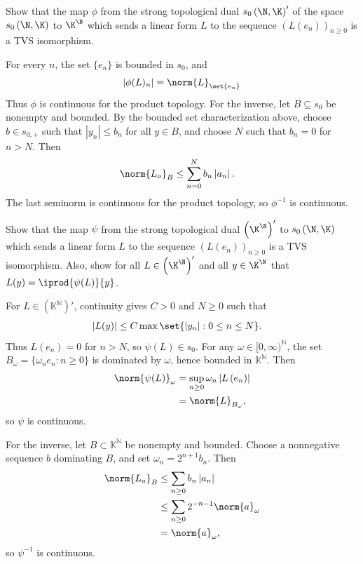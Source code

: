 \documentclass[10pt]{mypackage}
\begin{document}
\begin{problem}[Problem IV.1]
  Show that the map $\phi$ from the strong topological dual $s_0\left( \N,\K \right)'$ of the space $s_0\left( \N,\K \right)$ to $\K^{\N}$ which sends a linear form $L$ to the sequence $\left( L\left( e_n \right) \right)_{n\geq 0}$ is a TVS isomorphism.
\end{problem}
\begin{solution}
  For every \(n\), the set \(\{e_n\}\) is bounded in \(s_0\), and
  \begin{align*}
    \left\vert \phi(L)_n \right\vert= \norm{L}_{\set{e_n}}
  \end{align*}
Thus \(\phi\) is continuous for the product topology. For the inverse, let \(B\subseteq s_0\) be nonempty and bounded. By the bounded set characterization above, choose \(b\in s_{0,+}\) such that \(|y_n|\le b_n\) for all \(y\in B\), and choose \(N\) such that \(b_n=0\) for \(n>N\). Then
\begin{align*}
  \norm{L_a}_{B} &\leq \sum_{n=0}^{N} b_n\left\vert a_n \right\vert.
\end{align*}
The last seminorm is continuous for the product topology, so \(\phi^{-1}\) is continuous.
\end{solution}
\begin{problem}[Problem IV.2]
  Show that the map $\psi$ from the strong topological dual $\left( \K^{\N} \right)'$ to $s_0\left( \N,\K \right)$ which sends a linear form $L$ to the sequence $\left( L\left( e_n \right) \right)_{n\geq 0}$ is a TVS isomorphism. Also, show for all $L\in \left( \K^{\N} \right)'$ and all $y\in \K^{\N}$ that $L(y) = \iprod{\psi(L)}{y}$.
\end{problem}
\begin{solution}
  For \(L\in(\mathbb{K}^{\mathbb{N}})'\), continuity gives \(C>0\) and \(N\ge0\) such that
  \begin{align*}
    \left\vert L(y) \right\vert &\leq C\max\set{\left\vert y_n \right\vert : 0\leq n \leq N}.
  \end{align*}
  Thus \(L\left(e_n\right)=0\) for \(n>N\), so \(\psi(L)\in s_0\). For any \(\omega\in[0,\infty)^{\mathbb{N}}\), the set \(B_\omega=\{\omega_ne_n:n\ge0\}\) is dominated by \(\omega\), hence bounded in \(\mathbb{K}^{\mathbb{N}}\). Then
  \begin{align*}
    \norm{\psi(L)}_\omega&=\sup_{n\ge0}\omega_n\left\vert L\left(e_n\right) \right\vert\\
                         &=\norm{L}_{B_\omega},   
  \end{align*}
  so \(\psi\) is continuous.

  For the inverse, let \(B\subset\mathbb{K}^{\mathbb{N}}\) be nonempty and bounded. Choose a nonnegative sequence \(b\) dominating \(B\), and set \(\omega_n=2^{n+1}b_n\). Then
  \begin{align*}
    \norm{L_a}_{B} &\leq \sum_{n\geq 0} b_n\left\vert a_n \right\vert\\
                   &\leq \sum_{n\geq 0} 2^{-n-1} \norm{a}_{\omega}\\
                   &= \norm{a}_{\omega},
  \end{align*}
  so \(\psi^{-1}\) is continuous.
\end{solution}
\end{document}

